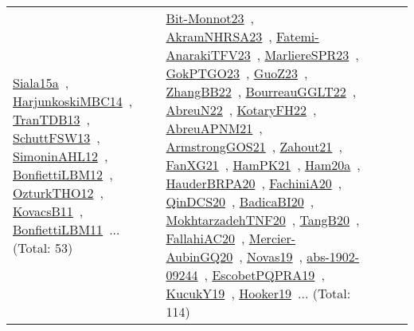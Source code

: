 {\begin{longtable}{lp{3cm}>{\raggedright\arraybackslash}p{6cm}>{\raggedright\arraybackslash}p{6cm}>{\raggedright\arraybackslash}p{8cm}}
\href{../works/Siala15a.pdf}{Siala15a}~\cite{Siala15a}, \href{../works/HarjunkoskiMBC14.pdf}{HarjunkoskiMBC14}~\cite{HarjunkoskiMBC14}, \href{../works/TranTDB13.pdf}{TranTDB13}~\cite{TranTDB13}, \href{../works/SchuttFSW13.pdf}{SchuttFSW13}~\cite{SchuttFSW13}, \href{../works/SimoninAHL12.pdf}{SimoninAHL12}~\cite{SimoninAHL12}, \href{../works/BonfiettiLBM12.pdf}{BonfiettiLBM12}~\cite{BonfiettiLBM12}, \href{../works/OzturkTHO12.pdf}{OzturkTHO12}~\cite{OzturkTHO12}, \href{../works/KovacsB11.pdf}{KovacsB11}~\cite{KovacsB11}, \href{../works/BonfiettiLBM11.pdf}{BonfiettiLBM11}~\cite{BonfiettiLBM11}... (Total: 53) & \href{../works/Bit-Monnot23.pdf}{Bit-Monnot23}~\cite{Bit-Monnot23}, \href{../works/AkramNHRSA23.pdf}{AkramNHRSA23}~\cite{AkramNHRSA23}, \href{../works/Fatemi-AnarakiTFV23.pdf}{Fatemi-AnarakiTFV23}~\cite{Fatemi-AnarakiTFV23}, \href{../works/MarliereSPR23.pdf}{MarliereSPR23}~\cite{MarliereSPR23}, \href{../works/GokPTGO23.pdf}{GokPTGO23}~\cite{GokPTGO23}, \href{../works/GuoZ23.pdf}{GuoZ23}~\cite{GuoZ23}, \href{../works/ZhangBB22.pdf}{ZhangBB22}~\cite{ZhangBB22}, \href{../works/BourreauGGLT22.pdf}{BourreauGGLT22}~\cite{BourreauGGLT22}, \href{../works/AbreuN22.pdf}{AbreuN22}~\cite{AbreuN22}, \href{../works/KotaryFH22.pdf}{KotaryFH22}~\cite{KotaryFH22}, \href{../works/AbreuAPNM21.pdf}{AbreuAPNM21}~\cite{AbreuAPNM21}, \href{../works/ArmstrongGOS21.pdf}{ArmstrongGOS21}~\cite{ArmstrongGOS21}, \href{../works/Zahout21.pdf}{Zahout21}~\cite{Zahout21}, \href{../works/FanXG21.pdf}{FanXG21}~\cite{FanXG21}, \href{../works/HamPK21.pdf}{HamPK21}~\cite{HamPK21}, \href{../works/Ham20a.pdf}{Ham20a}~\cite{Ham20a}, \href{../works/HauderBRPA20.pdf}{HauderBRPA20}~\cite{HauderBRPA20}, \href{../works/FachiniA20.pdf}{FachiniA20}~\cite{FachiniA20}, \href{../works/QinDCS20.pdf}{QinDCS20}~\cite{QinDCS20}, \href{../works/BadicaBI20.pdf}{BadicaBI20}~\cite{BadicaBI20}, \href{../works/MokhtarzadehTNF20.pdf}{MokhtarzadehTNF20}~\cite{MokhtarzadehTNF20}, \href{../works/TangB20.pdf}{TangB20}~\cite{TangB20}, \href{../works/FallahiAC20.pdf}{FallahiAC20}~\cite{FallahiAC20}, \href{../works/Mercier-AubinGQ20.pdf}{Mercier-AubinGQ20}~\cite{Mercier-AubinGQ20}, \href{../works/Novas19.pdf}{Novas19}~\cite{Novas19}, \href{../works/abs-1902-09244.pdf}{abs-1902-09244}~\cite{abs-1902-09244}, \href{../works/EscobetPQPRA19.pdf}{EscobetPQPRA19}~\cite{EscobetPQPRA19}, \href{../works/KucukY19.pdf}{KucukY19}~\cite{KucukY19}, \href{../works/Hooker19.pdf}{Hooker19}~\cite{Hooker19}... (Total: 114)\\

\end{longtable}}
